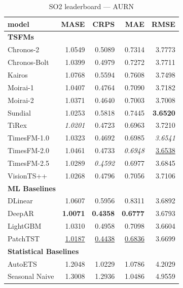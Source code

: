 \begin{table}[H]
\caption{SO2 leaderboard --- AURN}
\centering
\begin{small}
\begin{tabular}{lrrrr}
\toprule
model & MASE & CRPS & MAE & RMSE \\
\midrule
\multicolumn{5}{l}{\textbf{TSFMs}} \\
Chronos-2 & 1.0549 & 0.5089 & 0.7314 & 3.7773 \\
Chronos-Bolt & 1.0399 & 0.4979 & 0.7272 & 3.7711 \\
Kairos & 1.0768 & 0.5594 & 0.7608 & 3.7498 \\
Moirai-1 & 1.0407 & 0.4764 & 0.7090 & 3.7182 \\
Moirai-2 & 1.0371 & 0.4640 & 0.7003 & 3.7008 \\
Sundial & 1.0253 & 0.5818 & 0.7445 & \textbf{3.6520} \\
TiRex & \textit{1.0201} & 0.4723 & 0.6963 & 3.7210 \\
TimesFM-1.0 & 1.0323 & 0.4692 & 0.6985 & \textit{3.6541} \\
TimesFM-2.0 & 1.0461 & 0.4733 & \textit{0.6948} & \underline{3.6538} \\
TimesFM-2.5 & 1.0289 & \textit{0.4592} & 0.6977 & 3.6845 \\
VisionTS++ & 1.0268 & 0.4796 & 0.7056 & 3.7106 \\
\midrule
\multicolumn{5}{l}{\textbf{ML Baselines}} \\
DLinear & 1.0607 & 0.5956 & 0.8311 & 3.6892 \\
DeepAR & \textbf{1.0071} & \textbf{0.4358} & \textbf{0.6777} & 3.6793 \\
LightGBM & 1.0310 & 0.4958 & 0.7098 & 3.6604 \\
PatchTST & \underline{1.0187} & \underline{0.4438} & \underline{0.6836} & 3.6699 \\
\midrule
\multicolumn{5}{l}{\textbf{Statistical Baselines}} \\
AutoETS & 1.2048 & 1.0229 & 1.0786 & 4.2029 \\
Seasonal Naive & 1.3008 & 1.2936 & 1.0486 & 4.9559 \\
\bottomrule
\end{tabular}
\end{small}
\end{table}